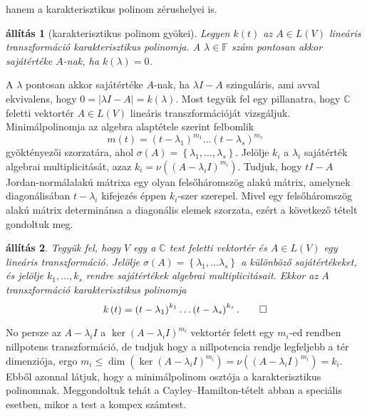 \documentclass[9pt, a4paper, showtrims]{memoir}
\makeatletter
\renewenvironment{proof}[1][\proofname]
    {\par\pushQED{\qed}%
    \normalfont \topsep6\p@\@plus6\p@\relax
    \trivlist
    \item[\hskip\labelsep
        \itshape
    #1\@addpunct{:}]\ignorespaces}
    {\popQED\endtrivlist\@endpefalse}
\theoremstyle{plain}
\newtheorem{proposition}{állítás}[chapter]
\theoremstyle{remark}
\theoremstyle{definition}
\makeatother
\begin{document}
hanem a karakterisztikus polinom zérushelyei is.
\begin{proposition}[karakterisztikus polinom gyökei]
    Legyen $k\left( t \right)$ az $A\in L\left( V \right)$ lineáris transzformáció karakterisztikus polinomja.
    A $\lambda\in\mathbb{F}$ szám pontosan akkor sajátértéke $A$-nak, 
    ha $k\left( \lambda \right)=0$.
\end{proposition}
\begin{proof}
    A $\lambda$ pontosan akkor sajátértéke $A$-nak, 
    ha $\lambda I-A$ szinguláris, 
    ami avval ekvivalens, hogy $0=|\lambda I-A|=k\left( \lambda \right)$.
\end{proof}
Most tegyük fel egy pillanatra, hogy $\mathbb{C}$ feletti vektortér $A\in L(V)$ lineáris transzformációját
vizsgáljuk. Minimálpolinomja az algebra alaptétele szerint felbomlik
\[
    m\left( t \right)
    =\left( t-\lambda_1 \right)^{m_1}\dots\left( t-\lambda_s \right)^{m_s}
\]
gyöktényezői szorzatára, ahol $\sigma\left( A \right)=\left\{ \lambda_1,\dots,\lambda_s\right\}$.
Jelölje $k_i$ a $\lambda_i$ sajátérték algebrai multiplicitását,
azaz $k_i=\nu\left( \left( A-\lambda_i I \right)^{m_i} \right)$.
Tudjuk, hogy $tI-A$ Jordan-normálalakú
mátrixa egy olyan felsőháromszög alakú mátrix,
amelynek diagonálisában $t-\lambda_i$ kifejezés éppen $k_i$-szer szerepel.
Mivel egy felsőháromszög alakú mátrix determinánsa a diagonális elemek szorzata,
ezért a következő tételt gondoltuk meg.
\begin{proposition}
    Tegyük fel, hogy $V$ egy a $\mathbb{C}$ test feletti vektortér és $A\in L\left( V \right)$ 
    egy lineáris transzformáció.
    Jelölje $\sigma\left( A \right)=\left\{\lambda_1,\dots\lambda_s  \right\}$ a különböző sajátértékeket,
    és jelölje $k_1,\dots,k_s$ rendre sajátértékek algebrai multiplicitásait.
    Ekkor az $A$ transzformáció karakterisztikus polinomja
    \[
        k\left( t \right)
        =
        \left( t-\lambda_1 \right)^{k_1}\dots\left( t-\lambda_s \right)^{k_s}.\qedhere
    \]
\end{proposition}
No persze az $A-\lambda_iI$ a $\ker\left( A-\lambda_iI \right)^{m_i}$ vektortér felett egy $m_i$-ed rendben nillpotens transzformáció,
de tudjuk hogy a nillpotencia rendje legfeljebb a tér dimenziója,
ergo 
$m_i\leq\dim\left( \ker\left( A-\lambda_iI \right)^{m_i} \right)
=
\nu\left( \left( A-\lambda_iI \right)^{m_i} \right)=k_i$.
Ebből azonnal látjuk, hogy a minimálpolinom osztója a karakterisztikus polinomnak.
Meggondoltuk tehát a Cayley--Hamilton-tételt abban a speciális esetben,
mikor a test a kompex számtest.
\end{document}
